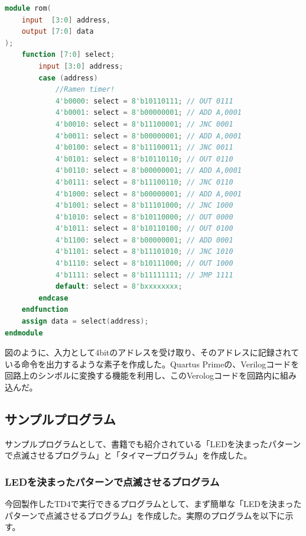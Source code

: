 \documentclass[dvipdfmx,a4j, titlepage]{jsarticle}
\begin{document}
\begin{lstlisting}[language=Verilog, label={rom_code}, title={図\thefigure　ROMを表すVerilogコード}]
module rom(
    input  [3:0] address,
    output [7:0] data
);
    function [7:0] select;
        input [3:0]	address;
        case (address)
            //Ramen timer!
            4'b0000: select = 8'b10110111; // OUT 0111
            4'b0001: select = 8'b00000001; // ADD A,0001
            4'b0010: select = 8'b11100001; // JNC 0001
            4'b0011: select = 8'b00000001; // ADD A,0001
            4'b0100: select = 8'b11100011; // JNC 0011
            4'b0101: select = 8'b10110110; // OUT 0110
            4'b0110: select = 8'b00000001; // ADD A,0001
            4'b0111: select = 8'b11100110; // JNC 0110
            4'b1000: select = 8'b00000001; // ADD A,0001
            4'b1001: select = 8'b11101000; // JNC 1000
            4'b1010: select = 8'b10110000; // OUT 0000
            4'b1011: select = 8'b10110100; // OUT 0100
            4'b1100: select = 8'b00000001; // ADD 0001
            4'b1101: select = 8'b11101010; // JNC 1010
            4'b1110: select = 8'b10111000; // OUT 1000
            4'b1111: select = 8'b11111111; // JMP 1111
            default: select = 8'bxxxxxxxx;
        endcase
    endfunction
    assign data = select(address);
endmodule
\end{lstlisting}

図\thefigure のように、入力として4bitのアドレスを受け取り、そのアドレスに記録されている命令を出力するような素子を作成した。Quartus Primeの、Verilogコードを回路上のシンボルに変換する機能を利用し、このVerologコードを回路内に組み込んだ。\\

\subsection{サンプルプログラム}
サンプルプログラムとして、書籍でも紹介されている「LEDを決まったパターンで点滅させるプログラム」と「タイマープログラム」を作成した。

\subsubsection{LEDを決まったパターンで点滅させるプログラム}
今回製作したTD4で実行できるプログラムとして、まず簡単な「LEDを決まったパターンで点滅させるプログラム」を作成した。実際のプログラムを以下に示す。\\
\end{document}
